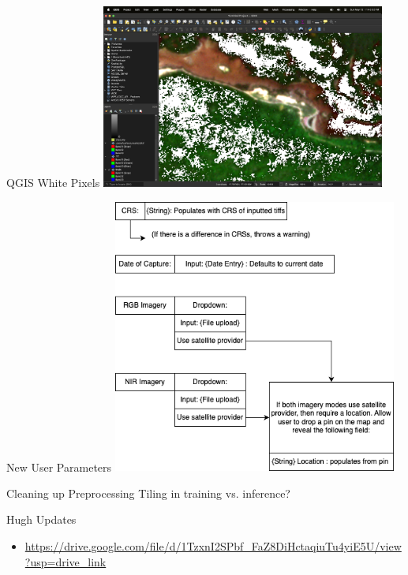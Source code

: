 \begin{frame}{QGIS White Pixels}
    \centering
    \includegraphics[height=0.7\textheight,width=0.7\textwidth,keepaspectratio]{images/white.png}
\end{frame}

\begin{frame}{New User Parameters}
    \centering
    \includegraphics[height=0.7\textheight,width=0.7\textwidth,keepaspectratio]{images/frontend_spring.png}
\end{frame}

\begin{frame}{Cleaning up Preprocessing}
    Tiling in training vs. inference?
\end{frame}

\begin{frame}{Hugh Updates}
    \begin{itemize}
        \item \url{https://drive.google.com/file/d/1TzxnI2SPbf_FaZ8DiHctaqiuTu4yiE5U/view?usp=drive_link}
    \end{itemize}
\end{frame}